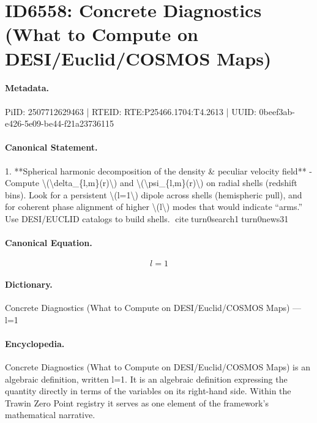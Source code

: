 \section*{ID6558: Concrete Diagnostics (What to Compute on DESI/Euclid/COSMOS Maps)}
\paragraph{Metadata.}
PiID: 2507712629463 | RTEID: RTE:P25466.1704:T4.2613 | UUID: 0beef3ab-e426-5e09-be44-f21a23736115

\paragraph{Canonical Statement.}
1. **Spherical harmonic decomposition of the density \& peculiar velocity field** - Compute \textbackslash{}(\textbackslash{}delta\_\{l,m\}(r)\textbackslash{}) and \textbackslash{}(\textbackslash{}psi\_\{l,m\}(r)\textbackslash{}) on radial shells (redshift bins). Look for a persistent \textbackslash{}(l=1\textbackslash{}) dipole across shells (hemispheric pull), and for coherent phase alignment of higher \textbackslash{}(l\textbackslash{}) modes that would indicate “arms.” Use DESI/EUCLID catalogs to build shells. citeturn0search1turn0news31

\paragraph{Canonical Equation.}
\[
l=1
\]

\paragraph{Dictionary.}
Concrete Diagnostics (What to Compute on DESI/Euclid/COSMOS Maps) — l=1

\paragraph{Encyclopedia.}
Concrete Diagnostics (What to Compute on DESI/Euclid/COSMOS Maps) is an algebraic definition, written l=1. It is an algebraic definition expressing the quantity directly in terms of the variables on its right-hand side. Within the Trawin Zero Point registry it serves as one element of the framework's mathematical narrative.
